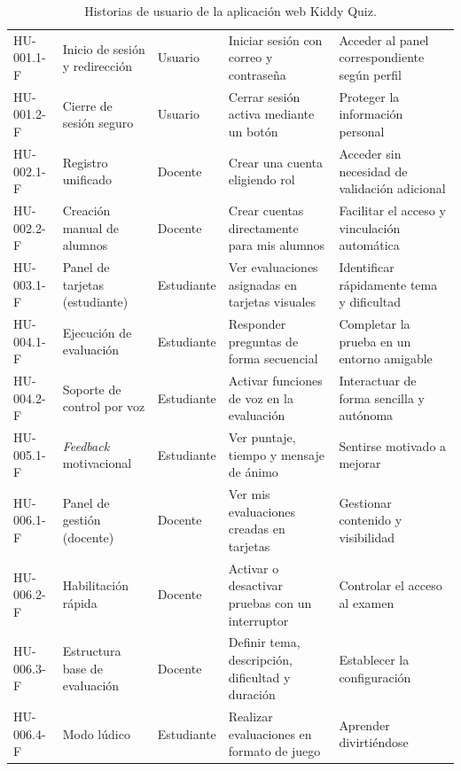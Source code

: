 \begin{table}[H]
\centering
\caption{Historias de usuario de la aplicación web Kiddy Quiz.}
\label{tab:hu}
\begin{footnotesize}
\begin{tabularx}{\textwidth}{|L{1.7cm}|L{3.5cm}|L{1.5cm}|X|X|}
\hline
{}
 &  &  &  & \\
\hline
HU-001.1-F & Inicio de sesión y redirección & Usuario & Iniciar sesión con correo y contraseña & Acceder al panel correspondiente según perfil\\
\hline
HU-001.2-F & Cierre de sesión seguro & Usuario & Cerrar sesión activa mediante un botón & Proteger la información personal\\
\hline
HU-002.1-F & Registro unificado & Docente & Crear una cuenta eligiendo rol & Acceder sin necesidad de validación adicional\\
\hline
HU-002.2-F & Creación manual de alumnos & Docente & Crear cuentas directamente para mis alumnos & Facilitar el acceso y vinculación automática\\
\hline
HU-003.1-F & Panel de tarjetas (estudiante) & Estudiante & Ver evaluaciones asignadas en tarjetas visuales & Identificar rápidamente tema y dificultad\\
\hline
HU-004.1-F & Ejecución de evaluación & Estudiante & Responder preguntas de forma secuencial & Completar la prueba en un entorno amigable\\
\hline
HU-004.2-F & Soporte de control por voz & Estudiante & Activar funciones de voz en la evaluación & Interactuar de forma sencilla y autónoma\\
\hline
HU-005.1-F & \textit{Feedback} motivacional & Estudiante & Ver puntaje, tiempo y mensaje de ánimo & Sentirse motivado a mejorar\\
\hline
HU-006.1-F & Panel de gestión (docente) & Docente & Ver mis evaluaciones creadas en tarjetas & Gestionar contenido y visibilidad\\
\hline
HU-006.2-F & Habilitación rápida & Docente & Activar o desactivar pruebas con un interruptor & Controlar el acceso al examen\\
\hline
HU-006.3-F & Estructura base de evaluación & Docente & Definir tema, descripción, dificultad y duración & Establecer la configuración\\
\hline
HU-006.4-F & Modo lúdico & Estudiante & Realizar evaluaciones en formato de juego & Aprender divirtiéndose\\

\end{tabularx}
\end{footnotesize}
\end{table}
